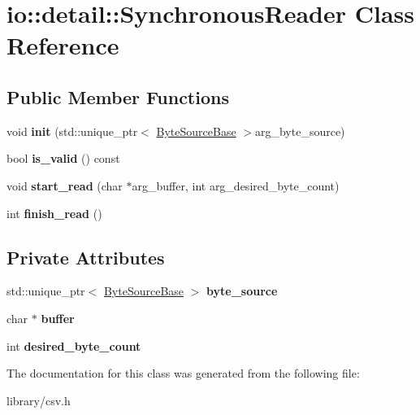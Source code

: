 \hypertarget{classio_1_1detail_1_1SynchronousReader}{}\section{io\+:\+:detail\+:\+:Synchronous\+Reader Class Reference}
\label{classio_1_1detail_1_1SynchronousReader}
\subsection*{Public Member Functions}
\begin{DoxyCompactItemize}
\item 
\mbox{\label{classio_1_1detail_1_1SynchronousReader_a4dc78563ff667b92ad3096a94e834eb5}} 
void {\bfseries init} (std\+::unique\+\_\+ptr$<$ \hyperlink{classio_1_1ByteSourceBase}{Byte\+Source\+Base} $>$arg\+\_\+byte\+\_\+source)
\item 
\mbox{\label{classio_1_1detail_1_1SynchronousReader_a9d6b2c888cc7020df1bb81c8bb5c58bc}} 
bool {\bfseries is\+\_\+valid} () const
\item 
\mbox{\label{classio_1_1detail_1_1SynchronousReader_a6cad1371b97e14f660914898b16433c4}} 
void {\bfseries start\+\_\+read} (char $\ast$arg\+\_\+buffer, int arg\+\_\+desired\+\_\+byte\+\_\+count)
\item 
\mbox{\label{classio_1_1detail_1_1SynchronousReader_a519a0cb25c641d2e51b6542749c44606}} 
int {\bfseries finish\+\_\+read} ()
\end{DoxyCompactItemize}
\subsection*{Private Attributes}
\begin{DoxyCompactItemize}
\item 
\mbox{\label{classio_1_1detail_1_1SynchronousReader_aa4ab4d5029b7d438051b4c800292059d}} 
std\+::unique\+\_\+ptr$<$ \hyperlink{classio_1_1ByteSourceBase}{Byte\+Source\+Base} $>$ {\bfseries byte\+\_\+source}
\item 
\mbox{\label{classio_1_1detail_1_1SynchronousReader_aa57e237e05bd90abdd9e896647da3fc7}} 
char $\ast$ {\bfseries buffer}
\item 
\mbox{\label{classio_1_1detail_1_1SynchronousReader_ac85e7a1b24cd383fb9fbfafe648f9ad6}} 
int {\bfseries desired\+\_\+byte\+\_\+count}
\end{DoxyCompactItemize}


The documentation for this class was generated from the following file\+:\begin{DoxyCompactItemize}
\item 
library/csv.\+h\end{DoxyCompactItemize}
